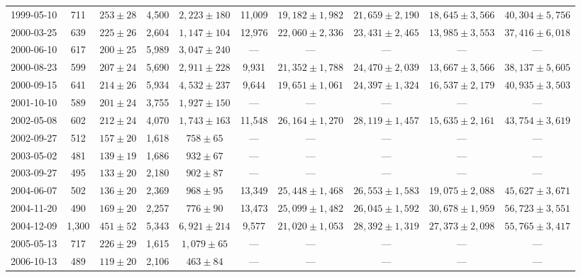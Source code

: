 \begin{landscape}
\begin{longtable}{cccccccccc}
{1999-05-10} & 711 & {$253  \pm  28$} & 4,500 & {$2,223 \pm 180$} & 11,009 & {$19,182 \pm 1,982$} & {$21,659 \pm 2,190$} & {$18,645 \pm 3,566$} & {$40,304 \pm 5,756$} \\
{2000-03-25} & 639 & {$225  \pm  26$} & 2,604 & {$1,147 \pm 104$} & 12,976 & {$22,060 \pm 2,336$} & {$23,431 \pm 2,465$} & {$13,985 \pm 3,553$} & {$37,416 \pm 6,018$} \\
{2000-06-10} & 617 & {$200  \pm  25$} & 5,989 & {$3,047 \pm 240$} & --- & --- & --- & --- & --- \\
{2000-08-23} & 599 & {$207  \pm  24$} & 5,690 & {$2,911 \pm 228$} & 9,931 & {$21,352 \pm 1,788$} & {$24,470 \pm 2,039$} & {$13,667 \pm 3,566$} & {$38,137 \pm 5,605$} \\
{2000-09-15} & 641 & {$214  \pm  26$} & 5,934 & {$4,532 \pm 237$} & 9,644 & {$19,651 \pm 1,061$} & {$24,397 \pm 1,324$} & {$16,537 \pm 2,179$} & {$40,935 \pm 3,503$} \\
{2001-10-10} & 589 & {$201  \pm  24$} & 3,755 & {$1,927 \pm 150$} & --- & --- & --- & --- & --- \\
{2002-05-08} & 602 & {$212  \pm  24$} & 4,070 & {$1,743 \pm 163$} & 11,548 & {$26,164 \pm 1,270$} & {$28,119 \pm 1,457$} & {$15,635 \pm 2,161$} & {$43,754 \pm 3,619$} \\
{2002-09-27} & 512 & {$157  \pm  20$} & 1,618 & {$758 \pm 65$} & --- & --- & --- & --- & --- \\
{2003-05-02} & 481 & {$139  \pm  19$} & 1,686 & {$932 \pm 67$} & --- & --- & --- & --- & --- \\
{2003-09-27} & 495 & {$133  \pm  20$} & 2,180 & {$902 \pm 87$} & --- & --- & --- & --- & --- \\
{2004-06-07} & 502 & {$136  \pm  20$} & 2,369 & {$968 \pm 95$} & 13,349 & {$25,448 \pm 1,468$} & {$26,553 \pm 1,583$} & {$19,075 \pm 2,088$} & {$45,627 \pm 3,671$} \\
{2004-11-20} & 490 & {$169  \pm  20$} & 2,257 & {$776 \pm 90$} & 13,473 & {$25,099 \pm 1,482$} & {$26,045 \pm 1,592$} & {$30,678 \pm 1,959$} & {$56,723 \pm 3,551$} \\
{2004-12-09} & 1,300 & {$451  \pm  52$} & 5,343 & {$6,921 \pm 214$} & 9,577 & {$21,020 \pm 1,053$} & {$28,392 \pm 1,319$} & {$27,373 \pm 2,098$} & {$55,765 \pm 3,417$} \\
{2005-05-13} & 717 & {$226  \pm  29$} & 1,615 & {$1,079 \pm 65$} & --- & --- & --- & --- & --- \\
{2006-10-13} & 489 & {$119  \pm  20$} & 2,106 & {$463 \pm 84$} & --- & --- & --- & --- & --- \\

\end{longtable}
\end{landscape}
